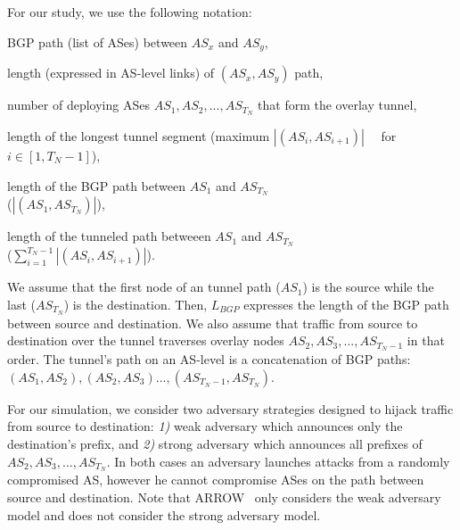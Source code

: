 For our study, we use the following notation:

\begin{description}
        \footnotesize
	\setlength{\itemsep}{-3pt}

	\item[$(AS_x, AS_y)$:] BGP path (list of ASes) between $AS_x$ and $AS_y$,

	\item[$|(AS_x, AS_y)|$:] length (expressed in AS-level links) of $(AS_x,
	AS_y)$ path,

	\item[$T_N$:] number of deploying ASes $AS_{1}, AS_{2}, ..., AS_{T_N}$ 
	that form the overlay \ete tunnel,

    \item[$T_L$:] length of the longest tunnel segment (\ie maximum $|(AS_{i},
        AS_{i+1})|\quad$ for $i\in[1,T_N-1]$),

	\item[$L_{BGP}$:] length of the BGP path between $AS_1$ and $AS_{T_N}$ \\(\ie $|(AS_1,AS_{T_N})|$),

    \item[$L_{T}$:] length of the tunneled path betweeen $AS_1$ and $AS_{T_N}$
        \\(\ie $\sum\limits_{i=1}^{T_N-1}|(AS_i,AS_{i+1})|$).

\end{description}

We assume that the first node of an \ete tunnel path ($AS_1$) is the source
while the last ($AS_{T_N}$) is the destination.  Then, $L_{BGP}$ expresses the
length of the BGP path between source and destination.  We also assume that
traffic from source to destination over the \ete tunnel traverses overlay nodes
$AS_2, AS_3, ..., AS_{T_N-1}$ in that order. The tunnel's path on an AS-level
is a concatenation of BGP paths: $(AS_{1}, AS_{2}),(AS_{2},
AS_{3})...,(AS_{T_N-1}, AS_{T_N})$.

For our simulation, we consider two adversary strategies designed to hijack
traffic from source to destination: \textit{1)} weak adversary which announces
only the destination's prefix, and \textit{2)} strong adversary which announces
all prefixes of $AS_{2}, AS_{3}, ..., AS_{T_N}$.  In both cases an adversary
launches attacks from a randomly compromised AS, however he cannot compromise
ASes on the path between source and destination. Note that
ARROW~\cite{DBLP:conf/sigcomm/PeterJZWAK14} only considers the weak adversary
model and does not consider the strong adversary model.

